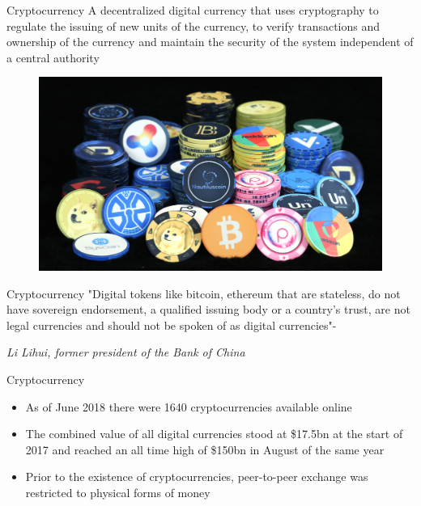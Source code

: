 \documentclass[11pt]{beamer}
\begin{document}

\begin{frame}{Cryptocurrency}
	A decentralized digital currency that uses cryptography to regulate the issuing of new units of the currency, to verify transactions and ownership of the currency and maintain the security of the system independent of a central authority
	\begin{figure}[]
		\centering
		\includegraphics  [width=2.in]{Images/cryptocurrency}
	\end{figure}
\end{frame}



\begin{frame}{Cryptocurrency}
	"Digital tokens like bitcoin, ethereum that are stateless, do not have sovereign endorsement, a qualified issuing body or a country's trust, are not legal currencies and should not be spoken of as digital currencies"- \begin{scriptsize}
	\textit{Li Lihui, former president of the Bank of China}
	\end{scriptsize}
\end{frame}



\begin{frame}{Cryptocurrency}
	\begin{itemize}
		\item As of June 2018 there were 1640 cryptocurrencies available online
		\item The combined value of all digital currencies stood at \$17.5bn at the start of 2017 and reached an all time high of \$150bn in August of the same year
		\item Prior to the existence of cryptocurrencies, peer-to-peer exchange was restricted to physical forms of money
	\end{itemize}
\end{frame}

\end{document}
